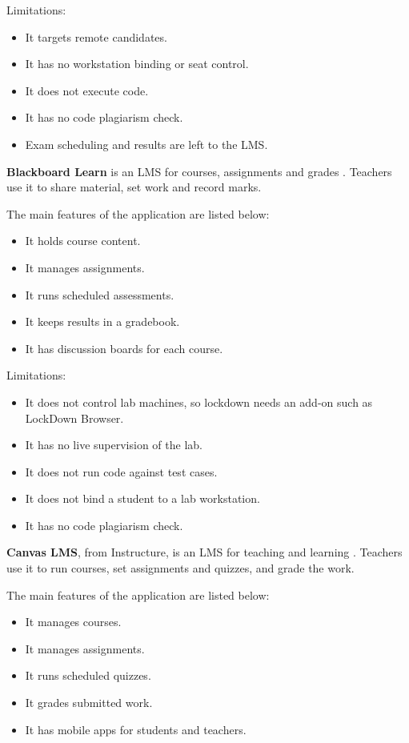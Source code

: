 \noindent Limitations:
\begin{itemize}[noitemsep]
\item It targets remote candidates.
\item It has no workstation binding or seat control.
\item It does not execute code.
\item It has no code plagiarism check.
\item Exam scheduling and results are left to the LMS.
\end{itemize}

\noindent\textbf{Blackboard Learn} is an LMS for courses, assignments and grades \cite{blackboard1}. Teachers use it to share material, set work and record marks.

\noindent The main features of the application are listed below:
\begin{itemize}[noitemsep]
\item It holds course content.
\item It manages assignments.
\item It runs scheduled assessments.
\item It keeps results in a gradebook.
\item It has discussion boards for each course.
\end{itemize}

\noindent Limitations:
\begin{itemize}[noitemsep]
\item It does not control lab machines, so lockdown needs an add-on such as LockDown Browser.
\item It has no live supervision of the lab.
\item It does not run code against test cases.
\item It does not bind a student to a lab workstation.
\item It has no code plagiarism check.
\end{itemize}

\noindent\textbf{Canvas LMS}, from Instructure, is an LMS for teaching and learning \cite{canvas1}. Teachers use it to run courses, set assignments and quizzes, and grade the work.

\noindent The main features of the application are listed below:
\begin{itemize}[noitemsep]
\item It manages courses.
\item It manages assignments.
\item It runs scheduled quizzes.
\item It grades submitted work.
\item It has mobile apps for students and teachers.
\end{itemize}

